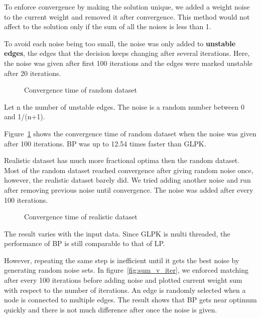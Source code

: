 To enforce convergence by making the solution unique, we added a weight noise to the current weight and removed it after convergence. 
This method would not affect to the solution only if the sum of all the noises is less than 1. 

To avoid each noise being too small, the noise was only added to \textbf{unstable edges}, the edges that the decision keeps changing after several iterations. 
Here, the noise was given after first 100 iterations and the edges were marked unstable after 20 iterations. 

\begin{figure}
\centering
\caption{Convergence time of random dataset}
\label{fig:randomconv}
\end{figure}

Let n the number of unstable edges. The noise is a random number between 0 and 1/(n+1). 

Figure~\ref{fig:randomconv} shows the convergence time of random dataset when the noise was given after 100 iterations. BP was up to 12.54 times faster than GLPK.

Realistic dataset has much more fractional optima then the random dataset. Most of the random dataset reached convergence after giving random noise once, however, the realistic dataset barely did. We tried adding another noise and run after removing previous noise until convergence. The noise was added after every 100 iterations.

\begin{figure}
\centering
\caption{Convergence time of realistic dataset}
\label{fig:init}
\end{figure}

The result varies with the input data. Since GLPK is multi threaded, the performance of BP is still comparable to that of LP.

However, repeating the same step is inefficient until it gets the best noise by generating random noise sets. 
In figure~\ref{fig:sum_v_iter}, we enforced matching after every 100 iterations before adding noise and plotted current weight sum with respect to the number of iterations. 
An edge is randomly selected when a node is connected to multiple edges.
The result shows that BP gets near optimum quickly and there is not much difference after once the noise is given. 

